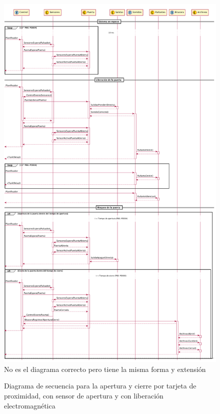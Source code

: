 \begin{figure}[ht]
	\centering
	\includegraphics[width=\textwidth]{Figures/PNK-DS002-A.pdf}
	{\color{red} No es el diagrama correcto pero tiene la misma forma y extensión}
	\caption{Diagrama de secuencia para la apertura y cierre por tarjeta de proximidad, con sensor de apertura y con liberación electromagnética}
	\label{fig:SecuenciaTarjeta}
\end{figure}

